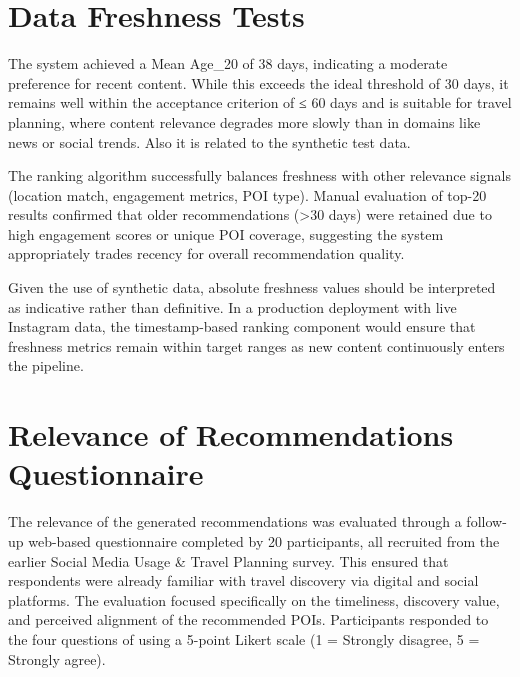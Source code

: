 \documentclass[a4paper,12pt]{report}
\begin{document}
\section{Data Freshness Tests}

The system achieved a Mean Age\_20 of 38 days, indicating a moderate preference for recent content. While this exceeds the ideal threshold of 30 days, it remains well within the acceptance criterion of ≤ 60 days and is suitable for travel planning, where content relevance degrades more slowly than in domains like news or social trends. Also it is related to the synthetic test data.

The ranking algorithm successfully balances freshness with other relevance signals (location match, engagement metrics, POI type). Manual evaluation of top-20 results confirmed that older recommendations (>30 days) were retained due to high engagement scores or unique POI coverage, suggesting the system appropriately trades recency for overall recommendation quality.

Given the use of synthetic data, absolute freshness values should be interpreted as indicative rather than definitive. In a production deployment with live Instagram data, the timestamp-based ranking component would ensure that freshness metrics remain within target ranges as new content continuously enters the pipeline.

\section{Relevance of Recommendations Questionnaire}

The relevance of the generated recommendations was evaluated through a follow-up web-based questionnaire completed by 20 participants, all recruited from the earlier Social Media Usage \& Travel Planning survey. This ensured that respondents were already familiar with travel discovery via digital and social platforms. The evaluation focused specifically on the timeliness, discovery value, and perceived alignment of the recommended POIs. Participants responded to the four questions of \cite{relevancesurvey} using a 5-point Likert scale (1 = Strongly disagree, 5 = Strongly agree).
\end{document}

